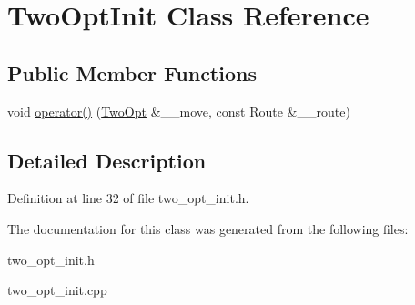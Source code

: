 \hypertarget{classTwoOptInit}{
\section{Two\-Opt\-Init Class Reference}
\label{classTwoOptInit}
}
\subsection*{Public Member Functions}
\begin{CompactItemize}
\item 
\hypertarget{classTwoOptInit_5bf6af064d37ebd955ffb5a623e78e1b}{
void \hyperlink{classTwoOptInit_5bf6af064d37ebd955ffb5a623e78e1b}{operator()} (\hyperlink{classTwoOpt}{Two\-Opt} \&\_\-\_\-move, const Route \&\_\-\_\-route)}
\label{classTwoOptInit_5bf6af064d37ebd955ffb5a623e78e1b}

\end{CompactItemize}


\subsection{Detailed Description}




Definition at line 32 of file two\_\-opt\_\-init.h.

The documentation for this class was generated from the following files:\begin{CompactItemize}
\item 
two\_\-opt\_\-init.h\item 
two\_\-opt\_\-init.cpp\end{CompactItemize}
